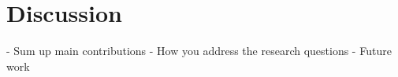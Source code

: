 
\chapter{Discussion} \label{discussion}



- Sum up main contributions
- How you address the research questions
- Future work